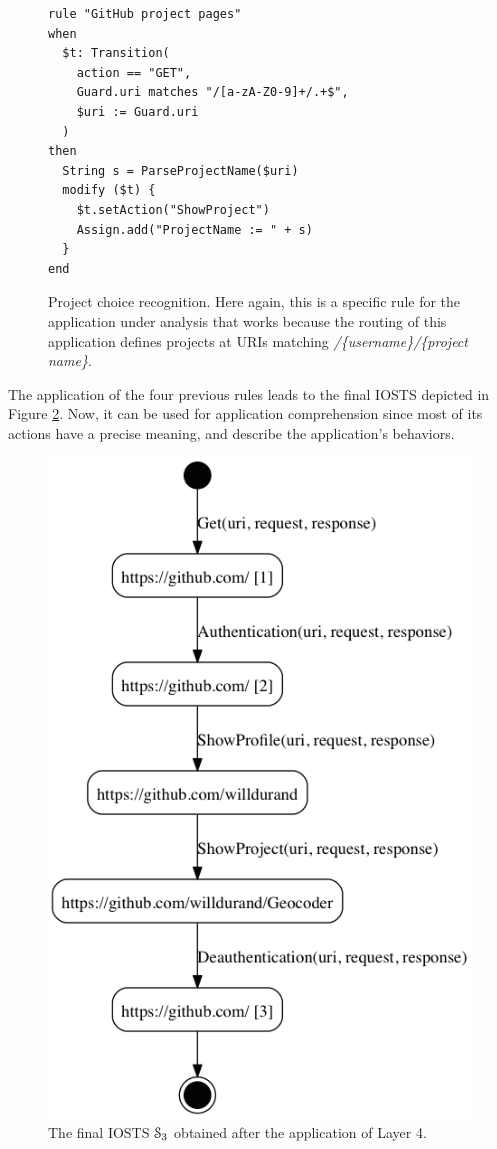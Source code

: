 \begin{figure}
\begin{framed}
\begin{BVerbatim}
rule "GitHub project pages"
when
  $t: Transition(
    action == "GET",
    Guard.uri matches "/[a-zA-Z0-9]+/.+$",
    $uri := Guard.uri
  )
then
  String s = ParseProjectName($uri)
  modify ($t) {
    $t.setAction("ShowProject")
    Assign.add("ProjectName := " + s)
  }
end
\end{BVerbatim}
\end{framed}

\caption{Project choice recognition. Here again, this is a
specific rule for the application under analysis that works
because the routing of this application defines projects at URIs
matching \textit{/\{username\}/\{project name\}}.}
\label{fig:rule:gh-project}
\end{figure}

\begin{example}
The application of the four previous rules leads to the final
IOSTS depicted in Figure \ref{fig:github:iosts:4}. Now, it can be
used for application comprehension since most of its actions have
a precise meaning, and describe the application's behaviors.
\end{example}

\begin{figure}[h]
    \begin{center}
    \includegraphics[width=0.6\linewidth]{figures/gh-iosts-41.png}
    \caption{The final IOSTS $\EuScript{S}_3$ obtained after the
    application of Layer 4.}
    \label{fig:github:iosts:4}
    \end{center}
\end{figure}

